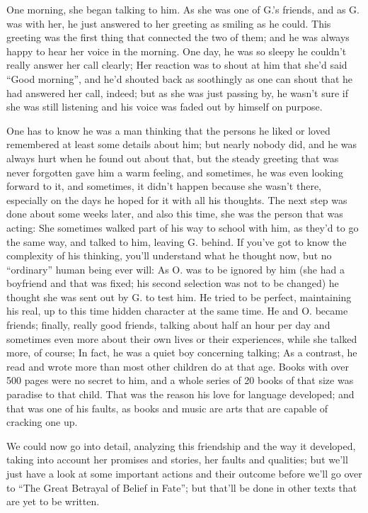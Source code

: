 One morning, she began talking to him. As she was one of G.'s friends, and as G. was with her, he just answered to her greeting as smiling as he could. This greeting was the first thing that connected the two of them; and he was always happy to hear her voice in the morning. One day, he was so sleepy he couldn't really answer her call clearly; Her reaction was to shout at him that she'd said \enquote{Good morning}, and he'd shouted back as soothingly as one can shout that he had answered her call, indeed; but as she was just passing by, he wasn't sure if she was still listening and his voice was faded out by himself on purpose.

One has to know he was a man thinking that the persons he liked or loved remembered at least some details about him; but nearly nobody did, and he was always hurt when he found out about that, but the steady greeting that was never forgotten gave him a warm feeling, and sometimes, he was even looking forward to it, and sometimes, it didn't happen because she wasn't there, especially on the days he hoped for it with all his thoughts. The next step was done about some weeks later, and also this time, she was the person that was acting: She sometimes walked part of his way to school with him, as they'd to go the same way, and talked to him, leaving G. behind. If you've got to know the complexity of his thinking, you'll understand what he thought now, but no \enquote{ordinary} human being ever will: As O. was to be ignored by him (she had a boyfriend and that was fixed; his second selection was not to be changed) he thought she was sent out by G. to test him. He tried to be perfect, maintaining his real, up to this time hidden character at the same time. He and O. became friends; finally, really good friends, talking about half an hour per day and sometimes even more about their own lives or their experiences, while she talked more, of course; In fact, he was a quiet boy concerning talking; As a contrast, he read and wrote more than most other children do at that age. Books with over 500 pages were no secret to him, and a whole series of 20 books of that size was paradise to that child. That was the reason his love for language developed; and that was one of his faults, as books and music are arts that are capable of cracking one up.

We could now go into detail, analyzing this friendship and the way it developed, taking into account her promises and stories, her faults and qualities; but we'll just have a look at some important actions and their outcome before we'll go over to \enquote{The Great Betrayal of Belief in Fate}; but that'll be done in other texts that are yet to be written.

